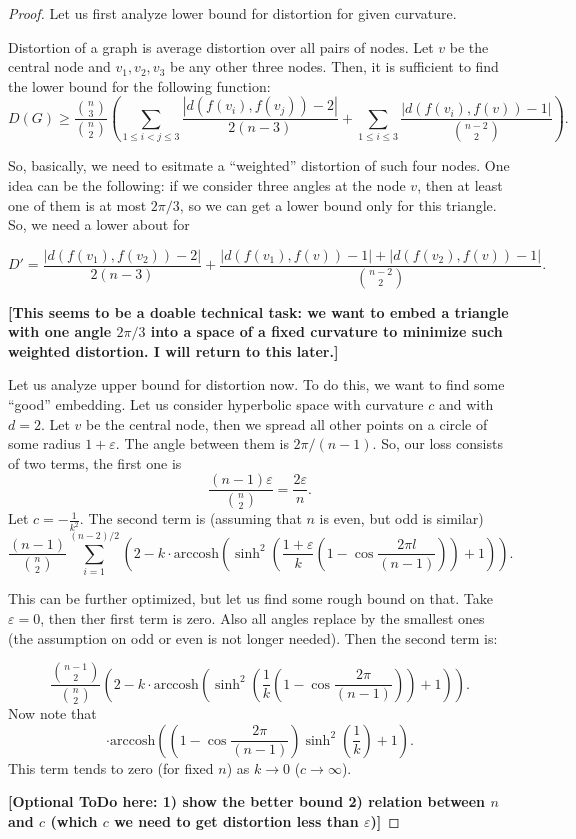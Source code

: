 \documentclass{article}
\begin{document}
\begin{proof}

Let us first analyze lower bound for distortion for given curvature.

Distortion of a graph is average distortion over all pairs of nodes. Let $v$ be the central node and $v_1, v_2, v_3$ be any other three nodes. Then, it is sufficient to find the lower bound for the following function: 
\[
D(G) \ge 
 \frac{{n \choose 3}}{{n \choose 2}} \left( \sum_{1\le i < j\le 3}  \frac{|d(f(v_i),f(v_j)) - 2|}{2(n-3)} + \sum_{1\le i \le 3}  \frac{|d(f(v_i),f(v)) - 1|}{{n-2 \choose 2}} \right).
\]

So, basically, we need to esitmate a ``weighted'' distortion of such four nodes. One idea can be the following: if we consider three angles at the node $v$, then at least one of them is at most $2 \pi / 3$, so we can get a lower bound only for this triangle. So, we need a lower about for

\[
D' =  \frac{|d(f(v_1),f(v_2)) - 2|}{2(n-3)} + \frac{|d(f(v_1),f(v)) - 1| + |d(f(v_2),f(v)) - 1|}{{n-2 \choose 2}}.
\]

\textbf{[This seems to be a doable technical task: we want to embed a triangle with one angle $2\pi/3$ into a space of a fixed curvature to minimize such weighted distortion. I will return to this later.]}

Let us analyze upper bound for distortion now. To do this, we want to find some ``good'' embedding. Let us consider hyperbolic space with curvature $c$ and with $d = 2$. Let $v$ be the central node, then we spread all other points on a circle of some radius $1 + \varepsilon$. The angle between them is $2 \pi / (n-1)$. So, our loss consists of two terms, the first one is
\[
\frac{(n-1) \varepsilon}{{n \choose 2}} = \frac{2\varepsilon}{n}.
\]
Let $c = - \frac{1}{k^2}$. The second term is (assuming that $n$ is even, but odd is similar)
\[
\frac{(n-1)}{{n\choose 2}}\sum_{i = 1}^{(n-2)/2}  \left(2 - k\cdot \mathrm{arccosh}\left( \sinh^2\left(\frac{1 + \varepsilon}{k}\left(1 - \cos \frac{2 \pi l}{(n-1)}\right) \right) + 1 \right)\right).
\]

This can be further optimized, but let us find some rough bound on that. Take $\varepsilon = 0$, then ther first term is zero. Also all angles replace by the smallest ones (the assumption on odd or even is not longer needed). Then the second term is:

\[
\frac{{n-1 \choose 2}}{{n\choose 2}} \left(2 - k\cdot \mathrm{arccosh}\left( \sinh^2\left(\frac{1}{k}\left(1 - \cos \frac{2 \pi}{(n-1)}\right) \right) + 1 \right)\right).
\]
Now note that 
\[
\cdot \mathrm{arccosh}\left(\left(1 - \cos \frac{2 \pi}{(n-1)}\right) \sinh^2\left(\frac{1}{k} \right) + 1 \right).
\]
This term tends to zero (for fixed $n$) as $k \to 0$ ($c \to \infty$).

\textbf{[Optional ToDo here: 1) show the better bound 2) relation between $n$ and $c$ (which $c$ we need to get distortion less than $\varepsilon$)]}

\end{proof}
\end{document}
